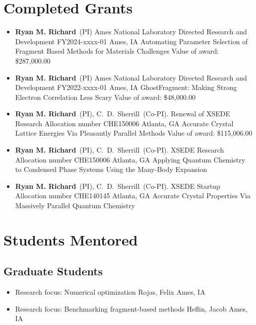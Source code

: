 \documentclass[11pt,a4paper,sans]{moderncv}
\begin{document}
\section{Completed Grants}
\vspace{5pt}
\begin{itemize}
	\item{
		{\textbf{Ryan M. Richard}\ (PI)}
		{Ames National Laboratory Directed Research and Development
			FY2024-xxxx-01}
		{Ames, IA}
		{}
		{Automating Parameter Selection of Fragment Based Methods for Materials
			Challenges}
		{Value of award: \$287,000.00}
		{}
	}
	\item{
		{\textbf{Ryan M. Richard}\ (PI)}
		{Ames National Laboratory Directed Research and Development
         FY2022-xxxx-01}
		{Ames, IA}
		{}
		{GhostFragment: Making Strong Electron Correlation Less Scary}
		{Value of award: \$48,000.00}
		{}
	}
	\item{
          {\textbf{Ryan M. Richard}\ (PI), C.~D.~Sherrill\ (Co-PI).}
          {Renewal of XSEDE Research Allocation number CHE150006}
          {Atlanta, GA}
          {}
          {Accurate Crystal Lattice Energies Via Pleasantly Parallel Methods}
          {Value of award: \$115,006.00}
          {}}
	\item{
          {\textbf{Ryan M. Richard}\ (PI), C.~D.~Sherrill\ (Co-PI).}
          {XSEDE Research Allocation number CHE150006}
          {Atlanta, GA}
          {}
          {Applying Quantum Chemistry to Condensed Phase Systems Using the
		  Many-Body Expansion}
          {}
          {}}
	\item{
          {\textbf{Ryan M. Richard}\ (PI), C.~D.~Sherrill\ (Co-PI).}
          {XSEDE Startup Allocation number CHE140145}
          {Atlanta, GA}
          {}
          {Accurate Crystal Properties Via Massively Parallel Quantum Chemistry}
          {}
          {}}
\end{itemize}

\section{Students Mentored}

	\subsection{Graduate Students}
	\begin{itemize}
		\item{
			{Research focus: Numerical optimization}
			{Rojas, Felix}
			{Ames, IA}
			{}{}
		}
		\item{
			{Research focus: Benchmarking fragment-based methods}
			{Heflin, Jacob}
			{Ames, IA}
			{}{}
		}
	\end{itemize}
\end{document}

